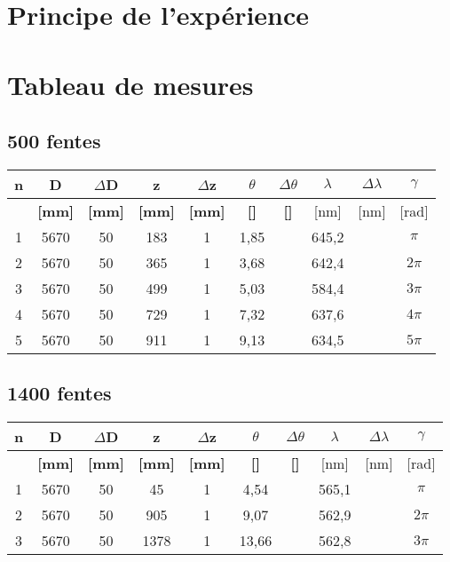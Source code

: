 \documentclass[11pt,a4paper]{report}
\begin{document}
	\section{Principe de l'expérience}
	\section{Tableau de mesures}
	\subsection{500 fentes}
	\begin{tabular}{|c|c|c|c|c|c|c|c|c|c|}
		\hline
		\bf n & \bf D & \bf $\Delta$D & \bf z & \bf $\Delta$z & \bf $\theta$ & \bf $\Delta \theta$ & $\lambda$& $\Delta \lambda$&\bf $\gamma$ \\
		\hline
		 & \bf [mm] & \bf [mm] & \bf [mm] & \bf [mm] & \bf [\degre]  & \bf [\degre]  &  [nm] & [nm] & [rad]\\
		\hline
		1 & 5670 & 50 & 183 &   1&1,85&  &645,2& &$\pi$\\
		2 & 5670 & 50 & 365 &  1&3,68&  &642,4& &$2\pi$\\
		3 & 5670 & 50 & 499 &  1&5,03&  &584,4& &$3\pi$\\
		4 & 5670 & 50 & 729 &  1&7,32&  &637,6& &$4\pi$\\
		5 & 5670 & 50 & 911 &  1&9,13&  &634,5& &$5\pi$\\
		\hline
	\end{tabular}
	\subsection{1400 fentes}
	\begin{tabular}{|c|c|c|c|c|c|c|c|c|c|}
		\hline
		\bf n & \bf D & \bf $\Delta$D & \bf z & \bf $\Delta$z & \bf $\theta$ & \bf $\Delta \theta$ & $\lambda$& $\Delta \lambda$&\bf $\gamma$ \\
		\hline
		 & \bf [mm] & \bf [mm] & \bf [mm] & \bf [mm] & \bf [\degre]  & \bf [\degre]  &  [nm] & [nm] & [rad]\\
		\hline
		1 & 5670 & 50 & 45 &   1&4,54&  &565,1& &$\pi$\\
		2 & 5670 & 50 & 905 &  1&9,07&  &562,9& &$2\pi$\\
		3 & 5670 & 50 & 1378 &  1&13,66&  &562,8& &$3\pi$\\
		\hline
	\end{tabular}
\end{document}
